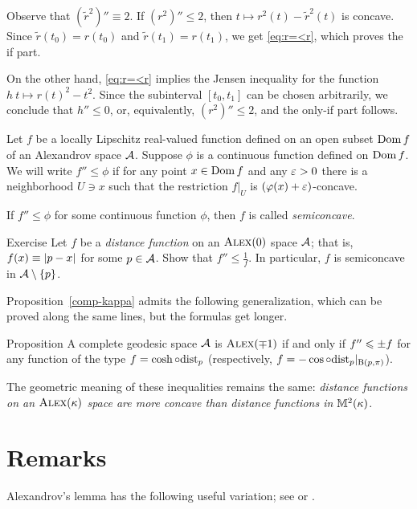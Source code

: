 Observe that $(\tilde r^2)''\equiv2$.
If $(r^2)''\le 2$, then $t\mapsto r^2(t)-\tilde r^2(t)$ is concave.
Since $\tilde r(t_0)=r(t_0)$ and $\tilde r(t_1)=r(t_1)$, we get \ref{eq:r=<r}, which proves the if part.

On the other hand, \ref{eq:r=<r} implies the Jensen inequality for the function $h\:t\mapsto r(t)^2-t^2$.
Since the subinterval $[t_0,t_1]$ can be chosen arbitrarily, we conclude that $h''\le 0$, or, equivalently, $(r^2)''\le 2$, and the only-if part follows.
\qeds

\label{sec:Semiconcave functions}
Let $f$ be a locally Lipschitz real-valued function defined on an open subset $\mathop{\rm Dom}\nolimits f$ of an Alexandrov space $\mathcal{A}$.
Suppose $\phi$ is a continuous function defined on $\mathop{\rm Dom}\nolimits f$.
We will write $f''\le \phi$ if for any point $x\in \mathop{\rm Dom}\nolimits f$ and any $\varepsilon>0$ there is a neighborhood $U\ni x$ such that the restriction $f|_U$ is $(\varphi(x)+\varepsilon)$-concave.


If $f''\le \phi$ for some continuous function $\phi$, then $f$ is called \emph{semiconcave}.

\begin{thm}{Exercise}\label{ex:distfun-semiconcave}
Let $f$ be a \emph{distance function} on an $\textup{\textsc{Alex}}(0)$ space $\mathcal{A}$;
that is, $f(x)\equiv\dist{p}{x}{}$ for some $p\in \mathcal{A}$.
Show that $f''\le \tfrac1f$.
In particular, $f$ is semiconcave in $\mathcal{A}\setminus\{p\}$.
\end{thm}

Proposition~\ref{comp-kappa} admits the following generalization, which can be proved along the same lines, but the formulas get longer.

\begin{thm}{Proposition}
A complete geodesic space $\mathcal{A}$ is $\textup{\textsc{Alex}}(\mp1)$
if and only if $f''\z\le \pm f$ for any function of the type $f=\cosh\circ\mathrm{dist}_p$ (respectively, $f=-\cos\circ\mathrm{dist}_p|_{\mathrm{B}{}(p,\pi)}$).
\end{thm}

The geometric meaning of these inequalities remains the same:
\textit{distance functions on an $\textup{\textsc{Alex}}(\kappa)$ space are more concave than distance functions in $\mathbb{M}^2(\kappa)$}.

\section{Remarks}

Alexandrov's lemma has the following useful variation; see \cite[10.2]{alexander-kapovitch-petrunin2024} or \cite[3.3]{alexander-kapovitch-kirszbraun}.

